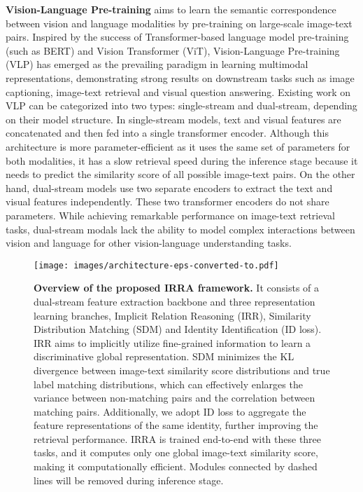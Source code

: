 \documentclass[10pt,twocolumn,letterpaper]{article}
\begin{document}
\textbf{Vision-Language Pre-training} aims to learn the semantic correspondence between vision and language modalities by pre-training on large-scale image-text pairs. Inspired by the success of Transformer-based\cite{vaswani2017attention} language model pre-training (such as BERT)\cite{kenton2019bert} and Vision Transformer (ViT)\cite{dosovitskiy2020image}, Vision-Language Pre-training (VLP) has emerged as the prevailing paradigm in learning multimodal representations, demonstrating strong results on downstream tasks such as image captioning\cite{chen2015microsoft}, image-text retrieval\cite{kiros2014unifying} and visual question answering\cite{antol2015vqa}.
Existing work on VLP can be categorized into two types: single-stream and dual-stream, depending on their model structure. In single-stream models\cite{chen2020uniter, su2019vl, kim2021vilt}, text and visual features are concatenated and then fed into a single transformer encoder. Although this architecture is more parameter-efficient as it uses the same set of parameters for both modalities, it has a slow retrieval speed during the inference stage because it needs to predict the similarity score of all possible image-text pairs. On the other hand, dual-stream models\cite{radford2021learning, jia2021scaling, dou2022empirical} use two separate encoders to extract the text and visual features independently. These two transformer encoders do not share parameters. While achieving remarkable performance on image-text retrieval tasks, dual-stream modals lack the ability to model complex interactions between vision and language for other vision-language understanding tasks.

\begin{figure*}[ht]
  \centerline{\texttt{[image: images/architecture-eps-converted-to.pdf]}}
  \caption{\textbf{Overview of the proposed IRRA framework.} It consists of a dual-stream feature extraction backbone and three representation learning branches, \ie Implicit Relation Reasoning (IRR), Similarity Distribution Matching (SDM) and Identity Identification (ID loss). IRR aims to implicitly utilize fine-grained information to learn a discriminative global representation. SDM minimizes the KL divergence between image-text similarity score distributions and true label matching distributions, which can effectively enlarges the variance between non-matching pairs and the correlation between matching pairs. Additionally, we adopt ID loss to aggregate the feature representations of the same identity, further improving the retrieval performance. IRRA is trained end-to-end with these three tasks, and it computes only one global image-text similarity score, making it computationally efficient. Modules connected by dashed lines will be removed during inference stage.}
  \label{fig2}
\end{figure*}
\end{document}
